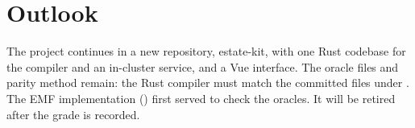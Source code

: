 \section{Outlook}
\label{sec:outlook}

The project continues in a new repository, estate-kit, with one Rust codebase for the
compiler and an in-cluster service, and a Vue interface. The oracle files and parity
method remain: the Rust compiler must match the committed files under
. The EMF implementation () first served
to check the oracles. It will be retired after the grade is recorded.
